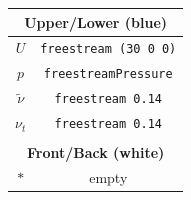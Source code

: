 \begin{table}[h!]
\begin{tabular}{cc}
        \multicolumn{2}{c}{\textbf{Upper/Lower (blue)}}      \\
        \hline
        $U$                    & \texttt{freestream (30 0 0)}           \\
        $p$                     &  \texttt{freestreamPressure}          \\
        $\tilde{\nu}$                    & \texttt{freestream 0.14}           \\
        $\nu_t$                    & \texttt{freestream 0.14}           \\
                & \\
        \multicolumn{2}{c}{\textbf{Front/Back (white)}}      \\
        \hline
        $\texttt{*}$                    & empty \\
        \end{tabular}
        \end{table}